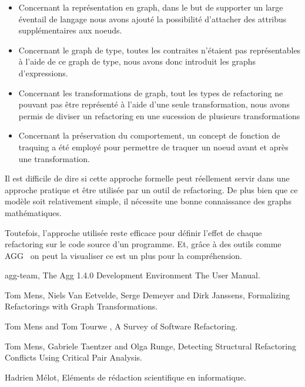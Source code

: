 \documentclass[a4paper, 12pt]{article}
\begin{document}
{\begin{itemize}[label=\textbullet]
    \item Concernant la représentation en graph, dans le but de supporter un large éventail de langage nous avons ajouté la possibilité d'attacher des attribus supplémentaires aux noeuds.

    \item Concernant le graph de type, toutes les contraites n'étaient pas représentables à l'aide de ce graph de type, nous avons donc introduit les graphs d'expressions.

    \item Concernant les transformations de graph, tout les types de refactoring ne pouvant pas être représenté à l'aide d'une seule transformation, nous avons permis de diviser un refactoring en une sucession de plusieurs transformations

    \item Concernant la préservation du comportement, un concept de fonction de traquing a été employé pour permettre de traquer un noeud avant et après une transformation.
  \end{itemize}

  Il est difficile de dire si cette approche formelle peut réellement servir dans une approche pratique et être utilisée par un outil de refactoring.
  De plus bien que ce modèle soit relativement simple, il nécessite une bonne connaissance des graphs mathématiques.

  Toutefois, l'approche utilisée reste efficace pour définir l'effet de chaque refactoring sur le code source d'un programme.
  Et, grâce à des outils comme AGG~\cite{aggSite} on peut la visualiser ce est un plus pour la compréhension.

  \newpage

  \begin{thebibliography}{9}

    agg-team,
    The Agg 1.4.0 Development Environment The User Manual.

    Tom Mens, Niels Van Eetvelde, Serge Demeyer and Dirk Janssens,
    Formalizing Refactorings with Graph Transformations.

    Tom Mens and Tom Tourwe ,
    A Survey of Software Refactoring.

    Tom Mens, Gabriele Taentzer and Olga Runge,
    Detecting Structural Refactoring Conflicts Using Critical Pair Analysis.

    Hadrien Mélot,
    Eléments de rédaction scientifique en informatique.


\end{thebibliography}}
\end{document}

